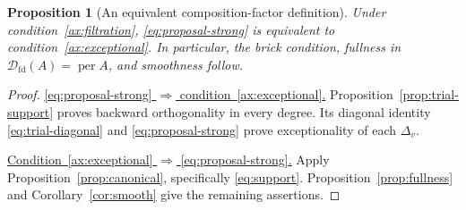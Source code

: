 \documentclass[11pt,a4paper]{article}
\newcommand{\D}{\mathcal D}
\newcommand{\std}{\Delta}
\DeclareMathOperator{\fd}{fd}
\DeclareMathOperator{\per}{per}
\theoremstyle{plain}
\newtheorem{proposition}[theorem]{Proposition}
\theoremstyle{definition}
\numberwithin{equation}{section}
\begin{document}
\begin{proposition}[An equivalent composition-factor definition]
\label{prop:trial-strong}
Under condition~\ref{ax:filtration},
\eqref{eq:proposal-strong} is equivalent to
condition~\ref{ax:exceptional}. In particular, the brick condition,
fullness in $\D_{\fd}(A)=\per A$, and smoothness follow.
\end{proposition}
\begin{proof}
\noindent\underline{\eqref{eq:proposal-strong} $\Rightarrow$
condition~\ref{ax:exceptional}.}
Proposition~\ref{prop:trial-support} proves backward orthogonality
in every degree. Its diagonal identity
\eqref{eq:trial-diagonal} and \eqref{eq:proposal-strong} prove
exceptionality of each $\std_v$.

\noindent\underline{Condition~\ref{ax:exceptional} $\Rightarrow$
\eqref{eq:proposal-strong}.}
Apply Proposition~\ref{prop:canonical}, specifically
\eqref{eq:support}. Proposition~\ref{prop:fullness} and
Corollary~\ref{cor:smooth} give the remaining assertions.
\end{proof}
\end{document}
